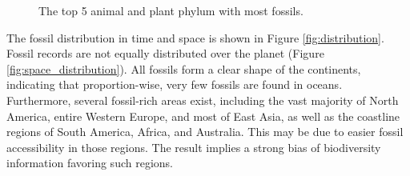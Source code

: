 \documentclass[11pt, a4paper,oneside,chapterprefix=false]{scrbook}
\begin{document}
\begin{figure}[h]
	\centering
	\hfill
	\caption{The top 5 animal and plant phylum with most fossils.}
	\label{fig:phylum}
\end{figure}

The fossil distribution in time and space is shown in Figure \ref{fig:distribution}. Fossil records are not equally distributed over the planet (Figure \ref{fig:space_distribution}). All fossils form a clear shape of the continents, indicating that proportion-wise, very few fossils are found in oceans. Furthermore, several fossil-rich areas exist, including the vast majority of North America, entire Western Europe, and most of East Asia, as well as the coastline regions of South America, Africa, and Australia. This may be due to easier fossil accessibility in those regions. The result implies a strong bias of biodiversity information favoring such regions. \\
\end{document}
